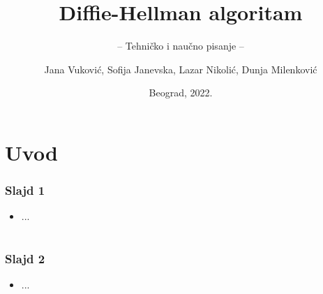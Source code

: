 \documentclass[14pt]{beamer}
\title{Diffie-Hellman algoritam}
\subtitle{-- Tehničko i naučno pisanje --}
\author{Jana Vuković, Sofija Janevska, Lazar Nikolić, Dunja Milenković}
\institute{Matematički fakultet\\Univerzitet u Beogradu}
\date{
	\footnotesize{Beograd, 2022.}	
}
\begin{document}
\begin{frame}
	\thispagestyle{empty}
	\titlepage
\end{frame}

\addtocounter{framenumber}{-1}

\section{Uvod}

\begin{frame}[fragile]\frametitle{Slajd 1}
	\begin{itemize}
		\item ...
	\end{itemize}
\end{frame}

\section*{}         %

\begin{frame}[fragile]\frametitle{Slajd 2}
	 \begin{itemize}
		\item ...
	\end{itemize}
\end{frame}
\end{document}
